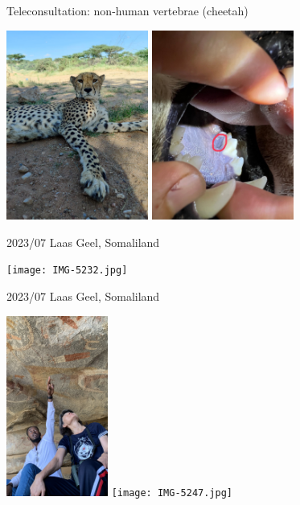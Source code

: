 \documentclass[aspectratio=169]{beamer}
\begin{document}
\begin{frame}{Teleconsultation: non-human vertebrae (cheetah)}
    \begin{center}
        \includegraphics[width=0.35\textwidth]{457256160987709682.jpg}        \includegraphics[width=0.35\textwidth, origin=c,angle=180]{IMG-5116.JPG}

    \end{center}
\end{frame}


\begin{frame}{2023/07 Laas Geel, Somaliland}
    \begin{center}
        \texttt{[image: IMG-5232.jpg]}

    \end{center}

\end{frame}


\begin{frame}{2023/07 Laas Geel, Somaliland}
    \begin{center}
        \includegraphics[width=0.25\textwidth]{IMG-5205.jpg}
        \texttt{[image: IMG-5247.jpg]}

    \end{center}

\end{frame}
\end{document}

